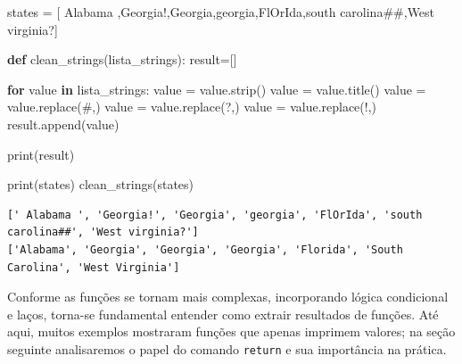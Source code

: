 \documentclass[
  brazilian,
  letterpaper,
  DIV=11,
  numbers=noendperiod]{scrreprt}
\newenvironment{Shaded}{\begin{snugshade}}{\end{snugshade}}
\newcommand{\BuiltInTok}[1]{\textcolor[rgb]{0.00,0.23,0.31}{#1}}
\newcommand{\ControlFlowTok}[1]{\textcolor[rgb]{0.00,0.23,0.31}{\textbf{#1}}}
\newcommand{\KeywordTok}[1]{\textcolor[rgb]{0.00,0.23,0.31}{\textbf{#1}}}
\newcommand{\NormalTok}[1]{\textcolor[rgb]{0.00,0.23,0.31}{#1}}
\newcommand{\OperatorTok}[1]{\textcolor[rgb]{0.37,0.37,0.37}{#1}}
\newcommand{\StringTok}[1]{\textcolor[rgb]{0.13,0.47,0.30}{#1}}
\begin{document}
\begin{Shaded}
\begin{Highlighting}[]
\NormalTok{states }\OperatorTok{=}\NormalTok{ [}\StringTok{\textquotesingle{} Alabama \textquotesingle{}}\NormalTok{,}\StringTok{\textquotesingle{}Georgia!\textquotesingle{}}\NormalTok{,}\StringTok{\textquotesingle{}Georgia\textquotesingle{}}\NormalTok{,}\StringTok{\textquotesingle{}georgia\textquotesingle{}}\NormalTok{,}\StringTok{\textquotesingle{}FlOrIda\textquotesingle{}}\NormalTok{,}\StringTok{\textquotesingle{}south carolina\#\#\textquotesingle{}}\NormalTok{,}\StringTok{\textquotesingle{}West virginia?\textquotesingle{}}\NormalTok{]}

\KeywordTok{def}\NormalTok{ clean\_strings(lista\_strings):}
\NormalTok{    result}\OperatorTok{=}\NormalTok{[]}
    
    \ControlFlowTok{for}\NormalTok{ value }\KeywordTok{in}\NormalTok{ lista\_strings:}
\NormalTok{        value }\OperatorTok{=}\NormalTok{ value.strip()}
\NormalTok{        value }\OperatorTok{=}\NormalTok{ value.title()}
\NormalTok{        value }\OperatorTok{=}\NormalTok{ value.replace(}\StringTok{\textquotesingle{}\#\textquotesingle{}}\NormalTok{,}\StringTok{\textquotesingle{}\textquotesingle{}}\NormalTok{)}
\NormalTok{        value }\OperatorTok{=}\NormalTok{ value.replace(}\StringTok{\textquotesingle{}?\textquotesingle{}}\NormalTok{,}\StringTok{\textquotesingle{}\textquotesingle{}}\NormalTok{)}
\NormalTok{        value }\OperatorTok{=}\NormalTok{ value.replace(}\StringTok{\textquotesingle{}!\textquotesingle{}}\NormalTok{,}\StringTok{\textquotesingle{}\textquotesingle{}}\NormalTok{)}
\NormalTok{        result.append(value)}
    
    \BuiltInTok{print}\NormalTok{(result)}

\BuiltInTok{print}\NormalTok{(states)}
\NormalTok{clean\_strings(states)}
\end{Highlighting}
\end{Shaded}

\begin{verbatim}
[' Alabama ', 'Georgia!', 'Georgia', 'georgia', 'FlOrIda', 'south carolina##', 'West virginia?']
['Alabama', 'Georgia', 'Georgia', 'Georgia', 'Florida', 'South Carolina', 'West Virginia']
\end{verbatim}

Conforme as funções se tornam mais complexas, incorporando lógica
condicional e laços, torna-se fundamental entender como extrair
resultados de funções. Até aqui, muitos exemplos mostraram funções que
apenas imprimem valores; na seção seguinte analisaremos o papel do
comando \texttt{return} e sua importância na prática.
\end{document}

